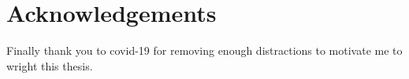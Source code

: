 \chapter*{Acknowledgements}
Finally thank you to covid-19 for removing enough distractions to motivate me to wright this thesis.